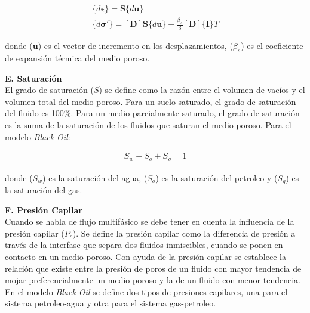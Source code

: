 \begin{ceqn} 
\begin{subequations} \label{eq:equ311} 
\begin{gather}
\{d\mathbf{\epsilon}\}=\mathbf{S} \{d\mathbf{u}\} \label{eq:equ311a} \\[5pt]
\{d\mathbf{\sigma'}\}=[\mathbf{D}]\mathbf{S}\{d\mathbf{u}\} - \frac{\beta_s}{3}[\mathbf{D}]\{\mathbf{I}\}T \label{eq:equ311b}
\end{gather}  
\end{subequations} 
\end{ceqn}
donde ($\mathbf{u}$) es el vector de incremento en los desplazamientos, ($\beta_s$) es el coeficiente de expansión térmica del medio poroso.\vspace{0.7cm}


\textbf{E. Saturación}
\\
El grado de saturación ($S$) se define como la razón entre el volumen de vacíos y el volumen total del medio poroso. Para un suelo saturado, el grado de saturación del fluido es 100\%. Para un medio parcialmente saturado, el grado de saturación es la suma de la saturación de los fluidos que saturan el medio poroso. Para el modelo \textit{Black-Oil}:

\begin{ceqn} 
\begin{gather} \label{eq:equ312} 
S_w + S_o + S_g = 1
\end{gather}  
\end{ceqn}

donde ($S_w$) es la saturación del agua, ($S_o$) es la saturación del petroleo y  ($S_g$) es la saturación del gas.\bigskip


\textbf{F. Presión Capilar}
\\
Cuando se habla de flujo multifásico se debe tener en cuenta la influencia de la presión capilar ($P_c$). Se define la presión capilar como la diferencia de presión a través de la interfase que separa dos fluidos inmiscibles, cuando se ponen en contacto en un medio poroso. Con ayuda de la presión capilar se establece la relación que existe entre la presión de poros de un fluido con mayor tendencia de mojar preferencialmente un medio poroso y la de un fluido con menor tendencia. En el modelo \textit{Black-Oil} se define dos tipos de presiones capilares, una para el sistema petroleo-agua y otra para el sistema gas-petroleo. \bigskip

